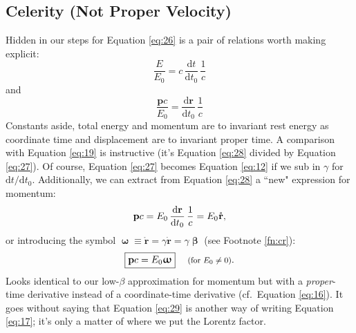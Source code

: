 \documentclass[12pt]{article}
\renewcommand{\vv}[1]{\mathbf{#1}}
\newcommand{\dd}[1]{\mathrm{d}#1}
\newcommand{\vvbeta}{\bm{\upbeta}}
\newcommand{\vvomega}{\bm{\upomega}}
\begin{document}
\subsection{Celerity (Not Proper Velocity)}\label{ssec:ce}

Hidden in our steps for Equation \ref{eq:26} is a pair of relations worth making explicit:
\begin{equation}\label{eq:27}
\dfrac{E}{E_0} = c \, \dfrac{\dd t}{\dd t_0} \, \dfrac{1}{c}
\end{equation}
and
\begin{equation}\label{eq:28}
\dfrac{\vv p c}{E_0} = \dfrac{\dd \vv r}{\dd t_0} \, \dfrac{1}{c}
\end{equation}
Constants aside, total energy and momentum are to invariant rest energy as coordinate time and displacement are to invariant proper time. A comparison with Equation \ref{eq:19} is instructive (it's Equation \ref{eq:28} divided by Equation \ref{eq:27}). Of course, Equation \ref{eq:27} becomes Equation \ref{eq:12} if we sub in $\gamma$ for $\dd t / \dd t_0$. Additionally, we can extract from Equation \ref{eq:28} a ``new" expression for momentum:
\begin{equation*}
\vv p c = E_0 \, \dfrac{\dd \vv r}{\dd t_0} \, \dfrac{1}{c} = E_0 \mkern.5mu \mathring{\vv r},
\end{equation*}
or introducing the symbol $\vvomega \equiv \mathring{\vv r} = \gamma \dot{\vv r} = \gamma \vvbeta$ (see Footnote \ref{fn:cr}):
\begin{equation}\label{eq:29}
\boxed{\vv p c = E_0 \vvomega} \quad \textrm{\footnotesize{ (for $E_0 \neq 0$)}}.
\end{equation}
Looks identical to our low-$\beta$ approximation for momentum but with a \emph{proper}-time derivative instead of a coordinate-time derivative (cf.\ Equation \ref{eq:16}). It goes without saying that Equation \ref{eq:29} is another way of writing Equation \ref{eq:17}; it's only a matter of where we put the Lorentz factor.
\end{document}
